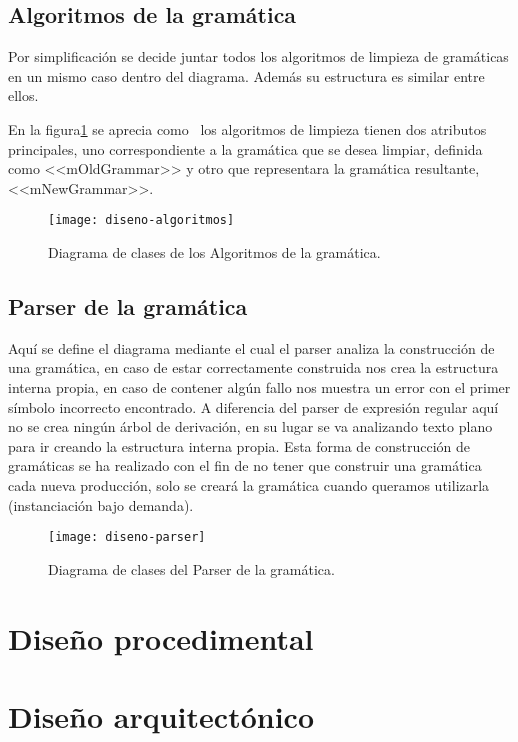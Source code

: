 \subsection{Algoritmos de la gramática}

Por simplificación se decide juntar todos los algoritmos de limpieza de gramáticas en un mismo caso dentro del diagrama. Además su estructura es similar entre ellos.

En la figura\ref{fig:4.3} se aprecia como ~los algoritmos de limpieza tienen dos atributos principales, uno correspondiente a la gramática que se desea limpiar, definida como <<mOldGrammar>> y otro que representara la gramática resultante, <<mNewGrammar>>.

\begin{figure}[h]
\centering
\texttt{[image: diseno-algoritmos]}
\caption{Diagrama de clases de los Algoritmos de la gramática\cite{thothv2}.}
\label{fig:4.3}
\end{figure}

\subsection{Parser de la gramática}

Aquí se define el diagrama mediante el cual el parser analiza la construcción de una gramática, en caso de estar correctamente construida nos crea la estructura interna propia, en caso de contener algún fallo nos muestra un error con el primer símbolo incorrecto encontrado.
A diferencia del parser de expresión regular aquí no se crea ningún árbol de
derivación, en su lugar se va analizando texto plano para ir creando la estructura interna propia.
Esta forma de construcción de gramáticas se ha realizado con el fin de no tener que construir una gramática cada nueva producción, solo se creará la gramática cuando queramos utilizarla (instanciación bajo demanda).

\begin{figure}[h]
\centering
\texttt{[image: diseno-parser]}
\caption{Diagrama de clases del Parser de la gramática\cite{thothv2}.}
\label{fig:4.}
\end{figure}

\section{Diseño procedimental}

\section{Diseño arquitectónico}


